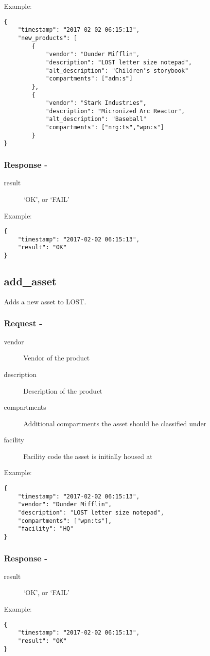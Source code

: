 \noindent Example:
\begin{verbatim}
{
    "timestamp": "2017-02-02 06:15:13",
    "new_products": [
        {
            "vendor": "Dunder Mifflin",
            "description": "LOST letter size notepad",
            "alt_description": "Children's storybook"
            "compartments": ["adm:s"]
        },
        {
            "vendor": "Stark Industries",
            "description": "Micronized Arc Reactor",
            "alt_description": "Baseball"
            "compartments": ["nrg:ts","wpn:s"]
        }
}
\end{verbatim}

\subsubsection*{Response -}
\begin{description}
\item[result] `OK', or `FAIL'
\end{description}

\noindent Example:
\begin{verbatim}
{
    "timestamp": "2017-02-02 06:15:13",
    "result": "OK"
}
\end{verbatim}


\subsection*{add\_asset}
Adds a new asset to LOST.
\\
\subsubsection*{Request -}
\begin{description}
\item[vendor] Vendor of the product
\item[description] Description of the product
\item[compartments] Additional compartments the asset should be classified under
\item[facility] Facility code the asset is initially housed at
\end{description}

\noindent Example:
\begin{verbatim}
{
    "timestamp": "2017-02-02 06:15:13",
    "vendor": "Dunder Mifflin",
    "description": "LOST letter size notepad",
    "compartments": ["wpn:ts"],
    "facility": "HQ"
}
\end{verbatim}


\subsubsection*{Response -}
\begin{description}
\item[result] `OK', or `FAIL'
\end{description}

\noindent Example:
\begin{verbatim}
{
    "timestamp": "2017-02-02 06:15:13",
    "result": "OK"
}
\end{verbatim}
